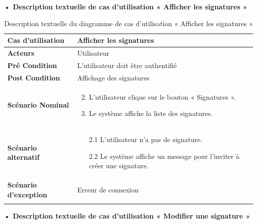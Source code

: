\textbf{•	Description textuelle de cas d'utilisation « Afficher les signatures »}

\begin{longtable}{|p{5cm}|p{10cm}|}
\hline
\textbf{Cas d'utilisation}&Afficher les signatures\\
\hline
\textbf{Acteurs}&Utilisateur \\
\hline
\textbf{Pré Condition}&L'utilisateur doit être authentifié\\
\hline
\textbf{Post Condition}&Affichage des signatures\\
\hline
\textbf{Scénario Nominal}&
\vspace{-\baselineskip}
\begin{enumerate}
    \setcounter{enumi}{1}
    \item L'utilisateur clique sur le bouton « Signatures ».
    \item Le système affiche la liste des signatures.
\end{enumerate}\\
\hline
\textbf{Scénario alternatif}&
\begin{enumerate}
  \item [2.1] L'utilisateur n'a pas de signature.
  \item [2.2] Le système affiche un message pour l'inviter à créer une signature.
\end{enumerate}\\
\hline
\textbf{Scénario d'exception}&Erreur de connexion\\
\hline
\caption{Description textuelle du diagramme de cas d'utilisation « Afficher les signatures »}
\label{tab:use_case_view_signature}
\end{longtable}

\textbf{•	Description textuelle de cas d'utilisation « Modifier une signature »}

